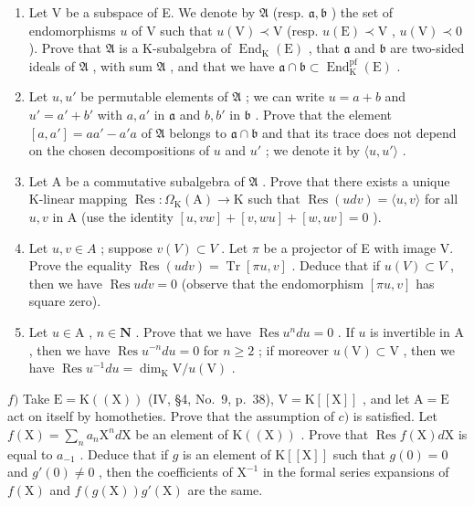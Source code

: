 \begin{enumerate}
\def\labelenumi{\alph{enumi})}
\item
  Let V be a subspace of E. We denote by \(\mathfrak{A}\) (resp. \(\mathfrak{a},\mathfrak{b}\) ) the set of endomorphisms \(u\) of V such that \(u(\mathrm{V})\prec \mathrm{V}\) (resp. \(u(\mathrm{E})\prec \mathrm{V}\) , \(u(\mathrm{V})\prec 0\) ). Prove that \(\mathfrak{A}\) is a K-subalgebra of \(\operatorname{End}_{\mathrm{K}}(\mathrm{E})\) , that \(\mathfrak{a}\) and \(\mathfrak{b}\) are two-sided ideals of \(\mathfrak{A}\) , with sum \(\mathfrak{A}\) , and that we have \(\mathfrak{a} \cap \mathfrak{b} \subset \operatorname{End}_{\mathrm{K}}^{\mathrm{pf}}(\mathrm{E})\) .
\item
  Let \(u, u'\) be permutable elements of \(\mathfrak{A}\) ; we can write \(u = a + b\) and \(u' = a' + b'\) with \(a, a'\) in \(\mathfrak{a}\) and \(b, b'\) in \(\mathfrak{b}\) . Prove that the element \([a, a'] = aa' - a'a\) of \(\mathfrak{A}\) belongs to \(\mathfrak{a} \cap \mathfrak{b}\) and that its trace does not depend on the chosen decompositions of \(u\) and \(u'\) ; we denote it by \(\langle u, u' \rangle\) .
\item
  Let A be a commutative subalgebra of \(\mathfrak{A}\) . Prove that there exists a unique K-linear mapping \(\operatorname{Res}:\Omega_{\mathrm{K}}(\mathrm{A})\to \mathrm{K}\) such that \(\operatorname{Res}(udv) = \langle u,v\rangle\) for all \(u,v\) in A (use the identity \([u,vw] + [v,wu] + [w,uv] = 0\) ).
\item
  Let \(u, v \in A\) ; suppose \(v(V) \subset V\) . Let \(\pi\) be a projector of E with image V. Prove the equality \(\operatorname{Res}(u dv) = \operatorname{Tr}[\pi u, v]\) . Deduce that if \(u(V) \subset V\) , then we have \(\operatorname{Res} u dv = 0\) (observe that the endomorphism \([\pi u, v]\) has square zero).
\item
  Let \(u \in \mathrm{A}\) , \(n \in \mathbf{N}\) . Prove that we have \(\operatorname{Res} u^n du = 0\) . If \(u\) is invertible in \(\mathrm{A}\) , then we have \(\operatorname{Res} u^{-n} du = 0\) for \(n \geqslant 2\) ; if moreover \(u(\mathrm{V}) \subset \mathrm{V}\) , then we have \(\operatorname{Res} u^{-1} du = \dim_{\mathrm{K}} \mathrm{V} / u(\mathrm{V})\) .
\end{enumerate}

\(f)\) Take \(\mathrm{E} = \mathrm{K}((\mathrm{X}))\) (IV, §4, No.~9, p.~38), \(\mathrm{V} = \mathrm{K}[[\mathrm{X}]]\) , and let \(\mathrm{A} = \mathrm{E}\) act on itself by homotheties. Prove that the assumption of \(c)\) is satisfied. Let \(f(\mathrm{X}) = \sum_{n} a_{n} \mathrm{X}^{n} d\mathrm{X}\) be an element of \(\mathrm{K}((\mathrm{X}))\) . Prove that \(\operatorname{Res} f(\mathrm{X}) d\mathrm{X}\) is equal to \(a_{-1}\) . Deduce that if \(g\) is an element of \(\mathrm{K}[[\mathrm{X}]]\) such that \(g(0) = 0\) and \(g'(0) \neq 0\) , then the coefficients of \(\mathrm{X}^{-1}\) in the formal series expansions of \(f(\mathrm{X})\) and \(f(g(\mathrm{X})) g'( \mathrm{X})\) are the same.

